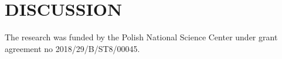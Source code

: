 \documentclass[]{spie}  %
\begin{document}
\section{DISCUSSION}

  
\appendix    %


\acknowledgments %
 
The research was funded by the Polish National Science Center under grant agreement 
no 2018/29/B/ST8/00045. 

\end{document}
